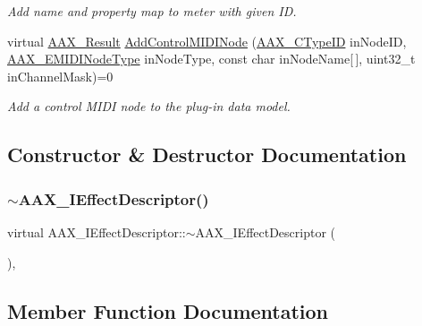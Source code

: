 \begin{DoxyCompactItemize}
\begin{DoxyCompactList}\small\item\em Add name and property map to meter with given ID. \end{DoxyCompactList}\item 
virtual \mbox{\hyperlink{a00392_a4d8f69a697df7f70c3a8e9b8ee130d2f}{A\+A\+X\+\_\+\+Result}} \mbox{\hyperlink{a01813_aa7709de005e0256feb522758ccc5b582}{Add\+Control\+M\+I\+D\+I\+Node}} (\mbox{\hyperlink{a00392_ac678f9c1fbcc26315d209f71a147a175}{A\+A\+X\+\_\+\+C\+Type\+ID}} in\+Node\+ID, \mbox{\hyperlink{a00491_a5e1dffce35d05990dbbad651702678e4}{A\+A\+X\+\_\+\+E\+M\+I\+D\+I\+Node\+Type}} in\+Node\+Type, const char in\+Node\+Name\mbox{[}$\,$\mbox{]}, uint32\+\_\+t in\+Channel\+Mask)=0
\begin{DoxyCompactList}\small\item\em Add a control M\+I\+DI node to the plug-\/in data model. \end{DoxyCompactList}\end{DoxyCompactItemize}


\subsection{Constructor \& Destructor Documentation}
\mbox{\label{a01813_a873d7fe13518d28081478912cfc1e311}} 
\subsubsection{\texorpdfstring{$\sim$AAX\_IEffectDescriptor()}{~AAX\_IEffectDescriptor()}}
{\footnotesize\ttfamily virtual A\+A\+X\+\_\+\+I\+Effect\+Descriptor\+::$\sim$\+A\+A\+X\+\_\+\+I\+Effect\+Descriptor (\begin{DoxyParamCaption}{ }\end{DoxyParamCaption})\hspace{0.3cm}{\ttfamily [inline]}, {\ttfamily [virtual]}}



\subsection{Member Function Documentation}
\mbox{\label{a01813_a2102ea4391f5b60e4d5e860a997383e4}} 

